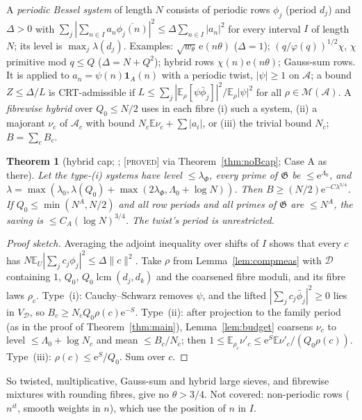 \documentclass[10pt,reqno]{amsart}
\newtheorem{theorem}{Theorem}[section]
\theoremstyle{definition}
\theoremstyle{remark}
\newcommand{\A}{\mathcal A}
\newcommand{\cG}{\mathfrak G}
\newcommand{\E}{\mathbb E}
\newcommand{\ind}{\mathbf 1}
\newcommand{\lcm}{\operatorname{lcm}}
\newcommand{\e}{\mathrm e}
\newcommand{\lab}[1]{\textup{[\textsc{#1}]}}
\begin{document}
A \emph{periodic Bessel system} of length $N$ consists of periodic rows
$\phi_j$ (period $d_j$) and $\Delta>0$ with
$\sum_j|\sum_{n\in I}a_n\overline{\phi_j(n)}|^2\leq\Delta\sum_{n\in I}|a_n|^2$ for every
interval $I$ of length $N$; its level is $\max_j\lambda(d_j)$.  Examples:
$\sqrt{w_\theta}\,\e(n\theta)$ ($\Delta=1$); $(q/\varphi(q))^{1/2}\chi$, $\chi$ primitive mod
$q\leq Q$ ($\Delta=N+Q^2$); hybrid rows $\chi(n)\e(n\theta)$; Gauss-sum rows.  It is
applied to $a_n=\psi(n)\ind_A(n)$ with a periodic twist, $|\psi|\geq1$ on $\A$; a
bound $Z\leq\Delta/L$ is CRT-admissible if
$L\leq\sum_j|\E_\rho[\psi\bar\phi_j]|^2/\E_\rho|\psi|^2$ for all $\rho\in\mathcal M(\A)$.  A
\emph{fibrewise hybrid} over $Q_0\leq N/2$ uses in each fibre (i) such a
system, (ii) a majorant $\nu_c$ of $\A_c$ with bound $N_c\E\nu_c+\sum|a_i|$, or
(iii) the trivial bound $N_c$; $B=\sum_cB_c$.

\begin{theorem}[hybrid cap; {\cite[Thm~2.4, Cor.~2.5]{LS2}}; \lab{proved} via Theorem~\ref{thm:noBcap}; Case A as there]\label{thm:hybrid}
Let the type-(i) systems have level $\leq\lambda_\Phi$, every prime of $\cG$ be
$\leq\e^{\Lambda_0}$, and $\lambda=\max(\lambda_0,\lambda(Q_0)+\max(2\lambda_\Phi,\Lambda_0+\log N))$.  Then
$B\geq(N/2)\e^{-C\lambda^{3/4}}$.  If $Q_0\leq\min(N^A,N/2)$ and all row periods and
all primes of $\cG$ are $\leq N^A$, the saving is $\leq C_A(\log N)^{3/4}$.  The
twist's period is unrestricted.
\end{theorem}
\begin{proof}[Proof sketch]
Averaging the adjoint inequality over shifts of $I$ shows that
every $c$ has $N\E_U|\sum_jc_j\phi_j|^2\leq\Delta\|c\|^2$.  Take $\rho$ from Lemma~\ref{lem:compmeas}
with $\mathcal D$ containing $1$, $Q_0$, $Q_0\lcm(d_j,d_k)$ and the coarsened
fibre moduli, and its fibre laws $\rho_c$.  Type~(i): Cauchy--Schwarz
removes $\psi$, and the lifted $|\sum_jc_j\bar\phi_j|^2\geq0$ lies in $V_{\mathcal D}$, so
$B_c\geq N_cQ_0\rho(c)\e^{-S}$.  Type~(ii): after projection to the family period (as in the proof of
Theorem~\ref{thm:main}), Lemma~\ref{lem:budget} coarsens $\nu_c$ to
level $\leq\Lambda_0+\log N_c$ and mean $\leq B_c/N_c$; then
$1\leq\E_{\rho_c}\nu'_c\leq\e^S\E\nu'_c/(Q_0\rho(c))$.  Type~(iii): $\rho(c)\leq\e^S/Q_0$.
Sum over $c$.
\end{proof}
So twisted, multiplicative, Gauss-sum and hybrid large sieves, and
fibrewise mixtures with rounding fibres, give no $\theta>3/4$.  Not covered:
non-periodic rows ($n^{it}$, smooth weights in $n$), which use the position
of $n$ in $I$.
\end{document}
